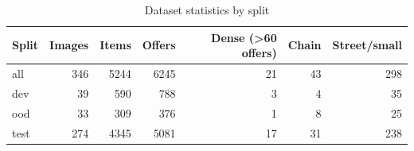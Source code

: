 \begin{table}[t]
\centering
\caption{Dataset statistics by split}
\label{tab:dataset}
\small
\begin{tabular}{lrrrrrr}
\toprule
Split & Images & Items & Offers & Dense (>60 offers) & Chain & Street/small \\
\midrule
all & 346 & 5244 & 6245 & 21 & 43 & 298 \\
dev & 39 & 590 & 788 & 3 & 4 & 35 \\
ood & 33 & 309 & 376 & 1 & 8 & 25 \\
test & 274 & 4345 & 5081 & 17 & 31 & 238 \\
\bottomrule
\end{tabular}
\par{}
\end{table}
